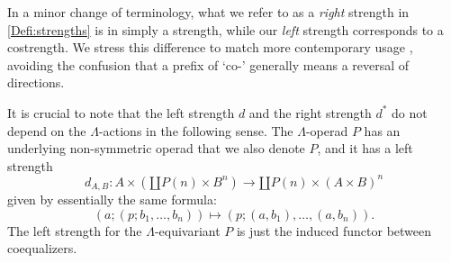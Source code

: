 \begin{remark}\label{rem:strength}
In a minor change of terminology, what we refer to as a \emph{right} strength in \cref{Defi:strengths} is in \cite[Section 3.1]{HP} simply a strength, while our \emph{left} strength corresponds to a costrength. We stress this difference to match more contemporary usage \cite[Definition 3.3]{mu-strong}, avoiding the confusion that a prefix of `co-' generally means a reversal of directions.
\end{remark}

\begin{rem}\label{rem:strength-nonsym}
It is crucial to note that the left strength $d$ and the right strength $d^{*}$ do not depend on the $\Lambda$-actions in the following sense. The $\Lambda$-operad $P$ has an underlying non-symmetric operad that we also denote $P$, and it has a left strength
  \[
    d_{A,B} \colon A \times \left(\amalg P(n) \times B^n\right) \rightarrow \amalg P(n) \times \left(A \times B \right)^n
  \]
given by essentially the same formula:
  \[
    \left( a; (p; b_{1}, \ldots, b_{n}) \right) \mapsto \left(p; (a,b_{1}), \ldots, (a, b_{n})\right).
  \]
The left strength for the $\Lambda$-equivariant $P$ is just the induced functor between coequalizers.
\end{rem}

